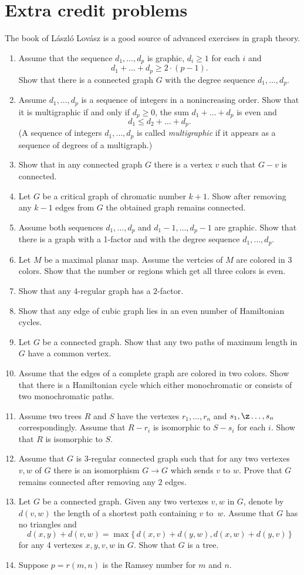 \chapter{Extra credit problems}

The book of L\'aszl\'o Lov\'asz \cite{lovasz} is a good source of advanced exercises in graph theory.

\begin{enumerate}
\item Assume that the sequence $d_1,\dots, d_p$ is graphic,
$d_i\ge 1$ for each $i$ and 
\[d_1+\dots+d_p\ge 2\cdot(p-1).\]
Show that there is a connected graph $G$ with the degree sequence $d_1,\dots, d_p$.
\item Assume $d_1,\dots, d_p$ is a sequence of integers in a nonincreasing order.
Show that it is multigraphic if and only if $d_p\ge0$, the sum $d_1+\dots+ d_p$ is even and 
\[d_1\le d_2+\dots+d_p.\]
(A sequence of integers $d_1,\dots, d_p$ is called \textit{multigraphic} if it appears as a sequence of degrees of a multigraph.)
\item Show that in any connected graph $G$ there is a vertex $v$ such that $G-v$ is connected.
\item Let $G$ be a critical graph of chromatic number $k+1$.
Show after removing any $k-1$ edges from $G$  
the obtained graph remains connected. 
\item Assume both sequences $d_1,\dots, d_p$
 and $d_1-1,\dots, d_p-1$ are graphic.
Show that there is a graph with a 1-factor and with the degree sequence $d_1,\dots, d_p$.
\item Let $M$ be a maximal planar map.
Assume the vertcies of $M$ are colored in 3 colors.
Show that the number or regions which get all three colors is even.
\item Show that any $4$-regular graph has a $2$-factor.
\item Show that any edge of cubic graph lies in an even number of Hamiltonian cycles.
\item Let $G$ be a  connected graph.
Show that any two paths of maximum length in $G$ have a common vertex.
\item Assume that the edges of a complete graph are colored in two colors.
Show that there is a Hamiltonian cycle which either monochromatic or consists of two monochromatic paths.
\item Assume two trees $R$ and $S$ 
have the vertexes $r_1,\dots,r_n$ and $s_1,\z\dots,s_n$ correspondingly.
Assume that $R-r_i$ is isomorphic to $S-s_i$ for each $i$.
Show that $R$ is isomorphic to $S$.
\item Assume that $G$ is $3$-regular connected graph such that 
for any two vertexes $v,w$ of $G$ there is an isomorphism
$G\to G$ which sends $v$ to $w$.
Prove that $G$ remains connected after removing any $2$ edges.
\item  Let $G$ be a connected graph.
Given any two vertexes $v,w$ in $G$, denote by $d(v,w)$ the length of a shortest path containing $v$ to~$w$. 
Assume that $G$ has no triangles and
\[d(x,y)+d(v,w)=\max\{\,d(x,v)+d(y,w),d(x,w)+d(y,v)\,\}\]
for any 4 vertexes $x,y,v,w$ in $G$.
Show that $G$ is a tree.
\item Suppose $p=r(m,n)$ is the Ramsey number for $m$ and $n$.


\end{enumerate}
